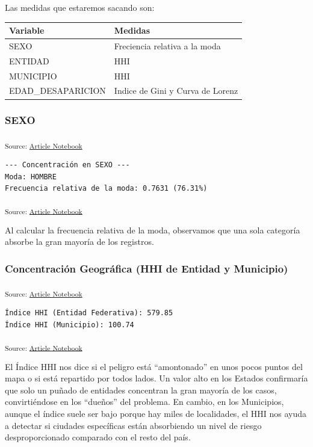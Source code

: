 \documentclass[
]{agujournal2019}
\newcounter{none} %
\begin{document}
Las medidas que estaremos sacando son:

{\def\LTcaptype{none} %
\begin{longtable}[]{@{}ll@{}}
\toprule\noalign{}
Variable & Medidas \\
\midrule\noalign{}
\endhead
\bottomrule\noalign{}
\endlastfoot
SEXO & Freciencia relativa a la moda \\
ENTIDAD & HHI \\
MUNICIPIO & HHI \\
EDAD\_DESAPARICION & Indice de Gini y Curva de Lorenz \\
\end{longtable}
}

\subsubsection{SEXO}\label{sexo-2}

\textsubscript{Source:
\href{https://Rou-uu.github.io/pruebaQuarto/index.qmd.html}{Article
Notebook}}

\begin{verbatim}
--- Concentración en SEXO ---
Moda: HOMBRE
Frecuencia relativa de la moda: 0.7631 (76.31%)
\end{verbatim}

\textsubscript{Source:
\href{https://Rou-uu.github.io/pruebaQuarto/index.qmd.html}{Article
Notebook}}

Al calcular la frecuencia relativa de la moda, observamos que una sola
categoría absorbe la gran mayoría de los registros.

\subsubsection{Concentración Geográfica (HHI de Entidad y
Municipio)}\label{concentraciuxf3n-geogruxe1fica-hhi-de-entidad-y-municipio}

\textsubscript{Source:
\href{https://Rou-uu.github.io/pruebaQuarto/index.qmd.html}{Article
Notebook}}

\begin{verbatim}
Índice HHI (Entidad Federativa): 579.85
Índice HHI (Municipio): 100.74
\end{verbatim}

\textsubscript{Source:
\href{https://Rou-uu.github.io/pruebaQuarto/index.qmd.html}{Article
Notebook}}

El Índice HHI nos dice si el peligro está ``amontonado'' en unos pocos
puntos del mapa o si está repartido por todos lados. Un valor alto en
los Estados confirmaría que solo un puñado de entidades concentran la
gran mayoría de los casos, convirtiéndose en los ``dueños'' del
problema. En cambio, en los Municipios, aunque el índice suele ser bajo
porque hay miles de localidades, el HHI nos ayuda a detectar si ciudades
específicas están absorbiendo un nivel de riesgo desproporcionado
comparado con el resto del país.
\end{document}
